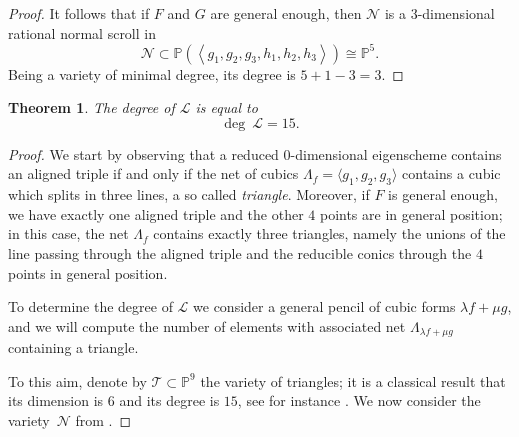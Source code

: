 \documentclass{amsart}
\theoremstyle{plain}
\newtheorem{theorem}[lemma]{Theorem}
\theoremstyle{definition}
\newcommand{\p}{\mathbb{P}}
\newcommand{\comment}[1]{}
\begin{document}
{\begin{proof}
It follows that if $F$ and $G$ are general enough, then $\mathcal{N}$ is a $3$-dimensional rational normal scroll in
\[
\mathcal{N} \subset \p(\left\langle g_1, g_2, g_3, h_1, h_2, h_3 \right\rangle) \cong \p^5.
\]
Being a variety of minimal degree, its degree is $5+1-3 = 3$.
\end{proof}

\begin{theorem}
The degree of $\mathcal L$ is equal to
\[
  \deg \ \mathcal L =  15.
\]
\end{theorem}

\begin{proof}
We start by observing that a reduced $0$-dimensional eigenscheme contains an aligned triple if and only if the net of cubics
$\Lambda_f = \langle g_1, g_2, g_3 \rangle$ contains a cubic which splits in three lines, a so called \emph{triangle}. Moreover, if $F$ is general enough, we have exactly one aligned triple and the other $4$ points are in general position; in this case, the net $\Lambda_f$ contains exactly three triangles, namely the unions of the line passing through the aligned triple and the reducible conics through the $4$ points in general position.

To determine the degree of $\mathcal L$ we consider a general pencil of cubic forms $\lambda f + \mu g$, and we will compute the number of elements with associated net $\Lambda_{\lambda f + \mu g}$ containing a triangle.

To this aim, denote by ${\mathcal T} \subset \p^9$ the variety of triangles; it is a classical result that its dimension is $6$ and its degree is $15$,
see for instance \cite[Section 2.2.2]{3264}. We now consider the variety~${\mathcal N}$ from .
%
%
%
\comment{
given by the union of the nets of cubics of the pencil
\[
{\mathcal N} = \bigcup_{(\lambda : \mu) \in \p^1} \Lambda_{\lambda f + \mu g} \subset \p^9.
\]
Observe that we can assume that ${\mathcal N}$ is an embedding of a rational projective bundle; indeed, it can be seen as an immersion of the $\p^2$-bundle over $\p^1$ given by the family the planes ${\mathcal P}=
\{\Sigma_{\lambda f + \mu g}\ : \ (\lambda:\mu)\in \p^1\} \subset \p^1 \times \p^9$. The map ${\mathcal P} \to {\mathcal N}$ contracts no subvariety of any plane of ${\mathcal P}$, so it is either an embedding or it contracts some horizontal curve. In the latter case, all the planes of the family should intersect in at least one point. In particular, the two nets $\Sigma_f$ and $\Sigma_g$ should have non-empty intersection.

}
\end{proof}}
\end{document}
